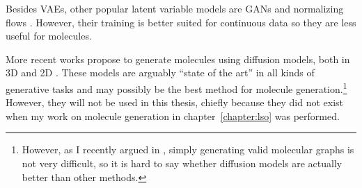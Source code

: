Besides VAEs, other popular latent variable models are GANs \citep{goodfellow2014generative}
and normalizing flows \citep{rezende2014stochastic,papamakarios2021normalizing}.
However, their training is better suited for continuous data so they are less useful for molecules.

More recent works propose to generate molecules using diffusion models,
both in 3D \citep{yang2023diffusionmodels,hoogeboom2022equivariant,xu2022geodiff,jing2022torsional}
and 2D \citep{jo2022scorebased,vignac2023digress,liu2023generativediffusion,yang2023diffusionmodels}.
These models are arguably ``state of the art'' in all kinds of generative tasks
and may possibly be the best method for molecule generation.\footnote{
    However, as I recently argued in \citet{tripp2023genetic},
    simply generating valid molecular graphs is not very difficult,
    so it is hard to say whether diffusion models are actually better than other methods.
}
However, they will not be used in this thesis, chiefly because they did not exist
when my work on molecule generation in chapter~\ref{chapter:lso} was performed.
